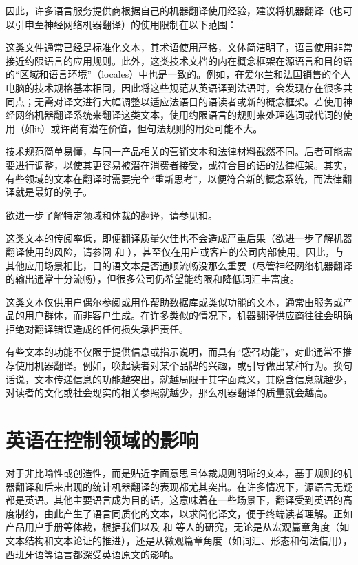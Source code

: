 \documentclass[output=paper,colorlinks,citecolor=brown]{langscibook}
\begin{document}
因此，许多语言服务提供商根据自己的机器翻译使用经验，建议将机器翻译（也可以引申至神经网络机器翻译）的使用限制在以下范围：

\begin{description}\sloppy
\item [某些类型的技术文档：] 
这类文件通常已经是标准化文本，其术语使用严格，文体简洁明了，语言使用非常接近约限语言的应用规则。此外，这类技术文档的内在概念框架在源语言和目的语的“区域和语言环境”（locales）中也是一致的。例如，在爱尔兰和法国销售的个人电脑的技术规格基本相同，因此将这些规范从英语译到法语时，会发现存在很多共同点；无需对译文进行大幅调整以适应法语目的语读者或新的概念框架。若使用神经网络机器翻译系统来翻译这类文本，使用约限语言的规则来处理选词或代词的使用（如it）或许尚有潜在价值，但句法规则的用处可能不大。

技术规范简单易懂，与同一产品相关的营销文本和法律材料截然不同。后者可能需要进行调整，以使其更容易被潜在消费者接受，或符合目的语的法律框架。其实，有些领域的文本在翻译时需要完全“重新思考”，以便符合新的概念系统，而法律翻译就是最好的例子。

欲进一步了解特定领域和体裁的翻译，请参见\citet{Olohan2015}和\citet{Šarcevic1997}。

\item[低风险的内部文件：]
这类文本的传阅率低，即便翻译质量欠佳也不会造成严重后果（欲进一步了解机器翻译使用的风险，请参阅\citealt{CanforaOttmann2020} 和 ），甚至仅在用户或客户的公司内部使用。因此，与其他应用场景相比，目的语文本是否通顺流畅没那么重要（尽管神经网络机器翻译的输出通常十分流畅），但很多公司仍希望能约限和降低词汇丰富度。

\item[低风险的外部文件：]
这类文本仅供用户偶尔参阅或用作帮助数据库或类似功能的文本，通常由服务或产品的用户群体，而非客户生成。在许多类似的情况下，机器翻译供应商往往会明确拒绝对翻译错误造成的任何损失承担责任。

有些文本的功能不仅限于提供信息或指示说明，而具有“感召功能”，对此通常不推荐使用机器翻译。例如，唤起读者对某个品牌的兴趣，或引导做出某种行为。换句话说，文本传递信息的功能越突出，就越局限于其字面意义，其隐含信息就越少，对读者的文化或社会现实的相关参照就越少，那么机器翻译的质量就会越高。
\end{description}

\section{英语在控制领域的影响}

对于非比喻性或创造性，而是贴近字面意思且体裁规则明晰的文本，基于规则的机器翻译和后来出现的统计机器翻译的表现都尤其突出。在许多情况下，源语言无疑都是英语。其他主要语言成为目的语，这意味着在一些场景下，翻译受到英语的高度制约，由此产生了语言同质化的文本，以求简化译文，便于终端读者理解。正如产品用户手册等体裁，根据我们以及\citet{Navarro2008} 和 \citet{Aixelá2011}等人的研究，无论是从宏观篇章角度（如文本结构和文本论证的推进），还是从微观篇章角度（如词汇、形态和句法借用），西班牙语等语言都深受英语原文的影响。
\end{document}
